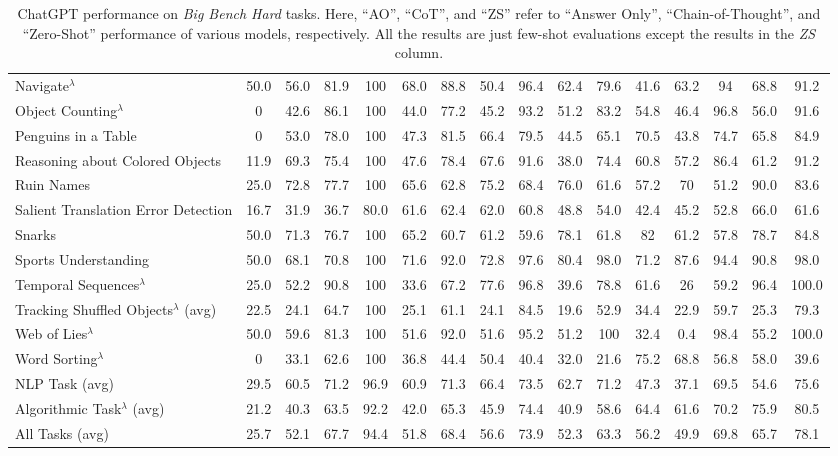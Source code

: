 \documentclass[11pt]{article}
\begin{document}
\begin{table*}
{\begin{tabular}{lccccccccccccccc}
        Navigate$^{\lambda}$ & 50.0 & 56.0 & 81.9 & 100 & 68.0 & 88.8 & 50.4 & 96.4 & 62.4 & 79.6 & 41.6 & 63.2 & 94 & 68.8 & 91.2 \\
        {Object Counting}$^{\lambda}$ & 0 & 42.6 & 86.1 & 100 & 44.0 & 77.2 & 45.2 & 93.2 & 51.2 & 83.2 & 54.8 & 46.4 & 96.8 & 56.0 & 91.6 \\
        Penguins in a Table & 0 & 53.0 & 78.0 & 100 & 47.3 & 81.5 & 66.4 & 79.5 & 44.5 & 65.1 & 70.5 & 43.8 & 74.7 & 65.8 & 84.9 \\
        Reasoning about Colored Objects & 11.9 & 69.3 & 75.4 & 100 & 47.6 & 78.4 & 67.6 & 91.6 & 38.0 & 74.4 & 60.8 & 57.2 & 86.4 & 61.2 & 91.2 \\
        Ruin Names & 25.0 & 72.8 & 77.7 & 100 & 65.6 & 62.8 & 75.2 & 68.4 & 76.0 & 61.6 & 57.2 & 70 & 51.2 & 90.0 & 83.6 \\
        Salient Translation Error Detection & 16.7 & 31.9 & 36.7 & 80.0 & 61.6 & 62.4 & 62.0 & 60.8 & 48.8 & 54.0 & 42.4 & 45.2 & 52.8 & 66.0 & 61.6 \\
        Snarks & 50.0 & 71.3 & 76.7 & 100 & 65.2 & 60.7 & 61.2 & 59.6 & 78.1 & 61.8 & 82 & 61.2 & 57.8 & 78.7 & 84.8 \\
        Sports Understanding & 50.0 & 68.1 & 70.8 & 100 & 71.6 & 92.0 & 72.8 & 97.6 & 80.4 & 98.0 & 71.2 & 87.6 & 94.4 & 90.8 & 98.0 \\
        {Temporal Sequences}$^{\lambda}$ & 25.0 & 52.2 & 90.8 & 100 & 33.6 & 67.2 & 77.6 & 96.8 & 39.6 & 78.8 & 61.6 & 26 & 59.2 & 96.4 & 100.0 \\
        {Tracking Shuffled Objects}$^{\lambda}$ (avg) & 22.5 & 24.1 & 64.7 & 100 & 25.1 & 61.1 & 24.1 & 84.5 & 19.6 & 52.9 & 34.4 & 22.9 & 59.7 & 25.3 & 79.3 \\
        {Web of Lies}$^{\lambda}$ & 50.0 & 59.6 & 81.3 & 100 & 51.6 & 92.0 & 51.6 & 95.2 & 51.2 & 100 & 32.4 & 0.4 & 98.4 & 55.2 & 100.0 \\
        {Word Sorting}$^{\lambda}$ & 0 & 33.1 & 62.6 & 100 & 36.8 & 44.4 & 50.4 & 40.4 & 32.0 & 21.6 & 75.2 & 68.8 & 56.8 & 58.0 & 39.6 \\
        \midrule
        NLP Task (avg) & 29.5 & 60.5 & 71.2 & 96.9 & 60.9 & 71.3 & 66.4 & 73.5 & 62.7 & 71.2 & 47.3 & 37.1 & 69.5 & 54.6 & 75.6 \\
        {Algorithmic Task}$^{\lambda}$ (avg) & 21.2 & 40.3 & 63.5 & 92.2 & 42.0 & 65.3 & 45.9 & 74.4 & 40.9 & 58.6 & 64.4 & 61.6 & 70.2 & 75.9 & 80.5 \\
        All Tasks (avg) & 25.7 & 52.1 & 67.7 & 94.4 & 51.8 & 68.4 & 56.6 & 73.9 & 52.3 & 63.3 & 56.2 & 49.9 & 69.8 & 65.7 & 78.1 \\
         \bottomrule
    \end{tabular}
    }
    \caption{ChatGPT performance on \emph{Big Bench Hard} tasks. Here, ``AO'', ``CoT'', and ``ZS'' refer to ``Answer Only'', ``Chain-of-Thought'', and ``Zero-Shot'' performance of various models, respectively. All the results are just few-shot evaluations except the results in the \emph{ZS} column.} 
    \label{tab:big_bench}
\end{table*} 
\end{document}
